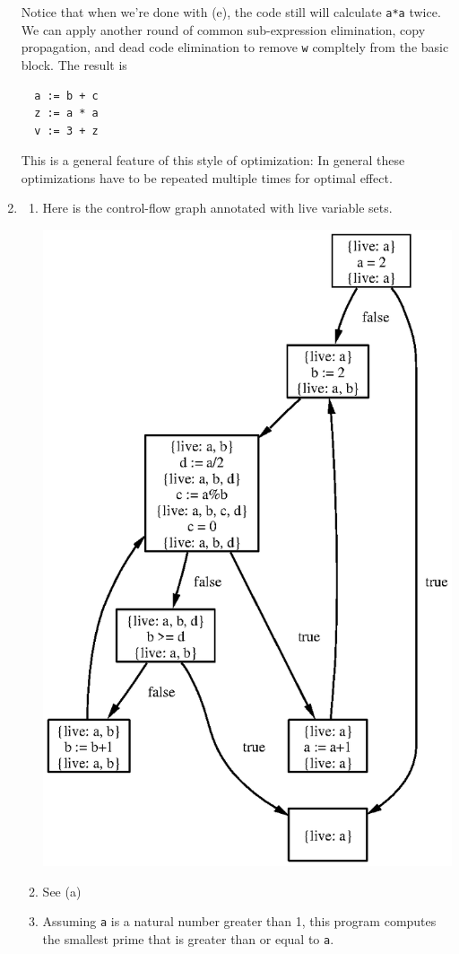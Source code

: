 \documentclass{article}
\begin{document}
\begin{enumerate}
Notice that when we're done with (e), the code still will calculate
\verb'a*a' twice.  We can apply another round of common sub-expression
elimination, copy propagation, and dead code elimination to remove
\texttt{w} compltely from the basic block.  The result is
\begin{verbatim}
  a := b + c
  z := a * a
  v := 3 + z
\end{verbatim}
This is a general feature of this style of optimization: In general
these optimizations have to be repeated multiple times for optimal
effect.

\newpage

\item
\begin{enumerate}
\item Here is the control-flow graph annotated with live variable sets.

\begin{center}
\includegraphics[angle=0]{wasn8-s2}
\end{center}

\item See (a)
\item Assuming \texttt{a} is a natural number greater than 1, this
program computes the smallest prime that is greater than or equal to
\texttt{a}.
\end{enumerate}
\end{enumerate}
\end{document}
